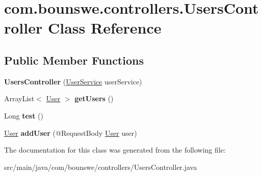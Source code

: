 \hypertarget{classcom_1_1bounswe_1_1controllers_1_1_users_controller}{}\section{com.\+bounswe.\+controllers.\+Users\+Controller Class Reference}
\label{classcom_1_1bounswe_1_1controllers_1_1_users_controller}
\subsection*{Public Member Functions}
\begin{DoxyCompactItemize}
\item 
\mbox{\label{classcom_1_1bounswe_1_1controllers_1_1_users_controller_a0a3434f97661f9d83af2c67521b9b392}} 
{\bfseries Users\+Controller} (\hyperlink{classcom_1_1bounswe_1_1services_1_1_user_service}{User\+Service} user\+Service)
\item 
\mbox{\label{classcom_1_1bounswe_1_1controllers_1_1_users_controller_ab45fc9120845ffb355d2f1cd901ec364}} 
Array\+List$<$ \hyperlink{classcom_1_1bounswe_1_1models_1_1_user}{User} $>$ {\bfseries get\+Users} ()
\item 
\mbox{\label{classcom_1_1bounswe_1_1controllers_1_1_users_controller_a355d0a44de6f7d90145c87f17da675b4}} 
Long {\bfseries test} ()
\item 
\mbox{\label{classcom_1_1bounswe_1_1controllers_1_1_users_controller_aad6568d2679b1ca7b6608ecb53ed99fe}} 
\hyperlink{classcom_1_1bounswe_1_1models_1_1_user}{User} {\bfseries add\+User} (@Request\+Body \hyperlink{classcom_1_1bounswe_1_1models_1_1_user}{User} user)
\end{DoxyCompactItemize}


The documentation for this class was generated from the following file\+:\begin{DoxyCompactItemize}
\item 
src/main/java/com/bounswe/controllers/Users\+Controller.\+java\end{DoxyCompactItemize}
